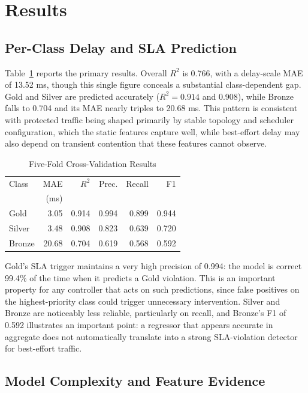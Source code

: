 \documentclass[12pt,onecolumn]{IEEEtran}
\begin{document}
\section{Results}

\subsection{Per-Class Delay and SLA Prediction}

Table~\ref{tab:main} reports the primary results. Overall $R^2$ is 0.766, with a delay-scale MAE of 13.52 ms, though this single figure conceals a substantial class-dependent gap. Gold and Silver are predicted accurately ($R^2=0.914$ and 0.908), while Bronze falls to 0.704 and its MAE nearly triples to 20.68 ms. This pattern is consistent with protected traffic being shaped primarily by stable topology and scheduler configuration, which the static features capture well, while best-effort delay may also depend on transient contention that these features cannot observe.

\begin{table}[t]
\caption{Five-Fold Cross-Validation Results}
\label{tab:main}
\centering
\setlength{\tabcolsep}{3.5pt}
\begin{tabular}{lrrrrr}
\toprule
Class & MAE & $R^2$ & Prec. & Recall & F1 \\
 & (ms) & & & & \\
\midrule
Gold   & 3.05  & 0.914 & 0.994 & 0.899 & 0.944 \\
Silver & 3.48  & 0.908 & 0.823 & 0.639 & 0.720 \\
Bronze & 20.68 & 0.704 & 0.619 & 0.568 & 0.592 \\
\bottomrule
\end{tabular}
\end{table}

Gold's SLA trigger maintains a very high precision of 0.994: the model is correct 99.4\% of the time when it predicts a Gold violation. This is an important property for any controller that acts on such predictions, since false positives on the highest-priority class could trigger unnecessary intervention. Silver and Bronze are noticeably less reliable, particularly on recall, and Bronze's F1 of 0.592 illustrates an important point: a regressor that appears accurate in aggregate does not automatically translate into a strong SLA-violation detector for best-effort traffic.

\subsection{Model Complexity and Feature Evidence}
\end{document}
